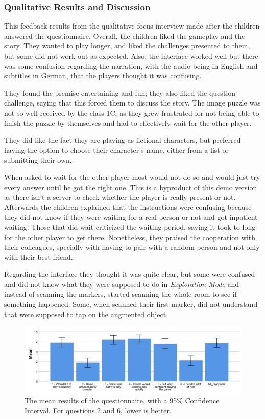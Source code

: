 \subsubsection{Qualitative Results and Discussion}
\par This feedback results from the qualitative focus interview made after the children answered the questionnaire. Overall, the children liked the gameplay and the story. They wanted to play longer, and liked the challenges presented to them, but some did not work out as expected. Also, the interface worked well but there was some confusion regarding the narration, with the audio being in English and subtitles in German, that the players thought it was confusing.
\par They found the premise entertaining and fun; they also liked the question challenge, saying that this forced them to discuss the story. The image puzzle was not so well received by the class 1C, as they grew frustrated for not being able to finish the puzzle by themselves and had to effectively wait for the other player.
\par They did like the fact they are playing as fictional characters, but preferred having the option to choose their character's name, either from a list or submitting their own.
\par When asked to wait for the other player most would not do so and would just try every answer until he got the right one. This is a byproduct of this demo version as there isn't a server to check whether the player is really present or not. Afterwards the children explained that the instructions were confusing because they did not know if they were waiting for a real person or not and got inpatient waiting. Those that did wait criticized the waiting period, saying it took to long for the other player to get there. Nonetheless, they praised the cooperation with their colleagues, specially with having to pair with a random person and not only with their best friend.  
\par Regarding the interface they thought it was quite clear, but some were confused and did not know what they were supposed to do in \textit{Exploration Mode} and instead of scanning the markers, started scanning the whole room to see if something happened. Some, when scanned their first marker, did not understand that were supposed to tap on the augmented object.

\begin{figure}
	\centering
	\includegraphics[scale = 0.35]{Mean.png}
	\caption{The mean results of the questionnaire, with a 95\% Confidence Interval. For questions 2 and 6, lower is better.}
	\label{fig:Evaluation1}
\end{figure}

